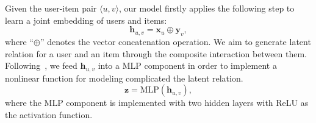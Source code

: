 Given the user-item pair $\langle u, v \rangle$, our model firstly applies the following step to learn a joint embedding of users and items:
\begin{equation}
\bm{h}_{u, v} = \bm{x}_u \oplus \bm{y}_v,
\end{equation}
where ``$\oplus$'' denotes the vector concatenation operation. We aim to generate latent relation for a user and an item through the composite interaction between them. 
Following~\cite{he2017neural}, we feed $\bm{h}_{u, v}$ into a MLP component in order to implement a nonlinear function for modeling complicated the latent relation.
\begin{equation}
\bm{z} = \text{MLP}(\bm{h}_{u, v}),
\end{equation}
where the MLP component is implemented with two hidden layers with ReLU as the activation function.


